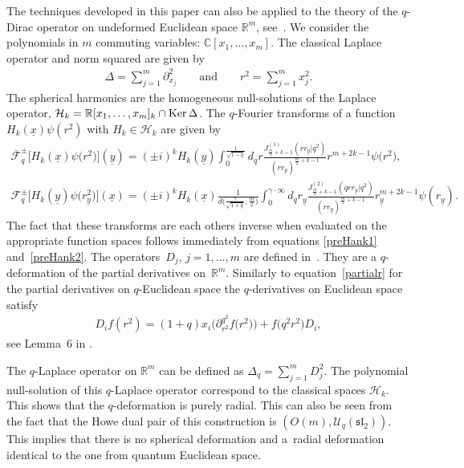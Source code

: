 \documentclass[pdftex]{sigma}
\newcommand{\mR}{\mathbb{R}}
\newcommand{\mC}{\mathbb{C}}
\newcommand{\cH}{\mathcal{H}}
\newcommand{\cF}{\mathcal{F}}
\newcommand{\cU}{\mathcal{U}}
\newcommand{\ux}{\underline{x}}
\newcommand{\uy}{\underline{y}}
\numberwithin{equation}{section}
\begin{document}
The techniques developed in this paper can also be applied to the theory of the $q$-Dirac operator on undeformed Euclidean space $\mR^m$, see~\cite{MR2595267}. We consider the polynomials in $m$ commuting variables: $\mC[x_1,\dots,x_m]$. The classical Laplace operator and norm squared are given by
\begin{gather*}
\Delta=\sum_{j=1}^m\partial^2_{x_j} \qquad \mbox{and} \qquad r^2=\sum_{j=1}^mx_j^2.
\end{gather*}
The spherical harmonics are the homogeneous null-solutions of the Laplace operator, $\cH_k=\mR[x_1,\dots,x_m]_k\cap {\rm Ker}\, \Delta$. The $q$-Fourier transforms of a function $H_k(\ux)\psi(r^2)$ with $H_k\in\cH_k$ are given by
\begin{gather*}
\overline{\cF}^{\pm}_{q}\big[H_k(\ux)\psi\big(r^2\big)\big](\underline{y}) = (\pm i)^kH_k(\uy)\int_0^{\frac{1}{\sqrt{1-q}}}d_qr\frac{J_{\frac{m}{2}+k-1}^{(1)}(rr_{\uy}|q^2)}{(rr_{\uy})^{\frac{m}{2}+k-1}}r^{m+2k-1}\psi\big(r^2\big),\\
\cF^{\pm}_{q}\big[H_k(\underline{y})\psi\big(r_{\uy}^2\big)\big](\ux) = (\pm i)^kH_k(\ux)\frac{1}{d\big(\frac{\gamma}{\sqrt{1+q}},\frac{m}{2}\big)}\int_0^{\gamma\cdot\infty}d_qr_{\uy}\frac{J_{\frac{m}{2}+k-1}^{(2)}
(qrr_{\uy}|q^2)}{(rr_{\uy})^{\frac{m}{2}+k-1}}r_{\uy}^{m+2k-1}\psi(r_{\uy}).
\end{gather*}
The fact that these transforms are each others inverse when evaluated on the appropriate function spaces follows immediately from equations \eqref{preHank1} and~\eqref{preHank2}. The operators~$D_j$, $j=1,\dots,m$ are def\/ined in~\cite[equation~(25) and Def\/inition~2]{MR2595267}. They are a $q$-deformation of the partial derivatives on~$\mR^m$. Similarly to equation~\eqref{partialr} for the partial derivatives on $q$-Euclidean space the $q$-derivatives on Euclidean space satisfy{\samepage
\begin{gather*}
D_if(r^2)=(1+q)x_i\big(\partial_{r^2}^{q^2}f\big(r^2\big)\big)+f\big(q^2r^2\big)D_i,
\end{gather*}
see Lemma~6 in \cite{MR2595267}.}

The $q$-Laplace operator on $\mR^m$ can be def\/ined as $ \Delta_q=\sum\limits_{j=1}^mD_j^2$. The polynomial null-solution of this $q$-Laplace operator correspond to the classical spaces $\cH_k$. This shows that the $q$-deformation is purely radial. This can also be seen from the fact that the Howe dual pair of this construction is $(O(m),\cU_q(\mathfrak{sl}_2))$. This implies that there is no spherical deformation and a~radial deformation identical to the one from quantum Euclidean space.
\end{document}
